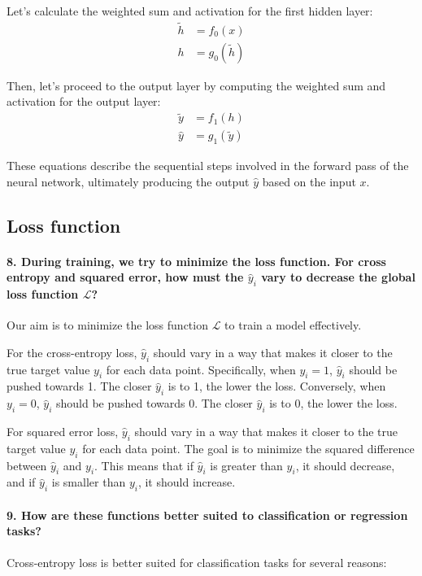 Let's calculate the weighted sum and activation for the first hidden layer:
\begin{align*}
    \tilde{h} & = f_0(x)         \\
    h         & = g_0(\tilde{h})
\end{align*}

Then, let's proceed to the output layer by computing the weighted sum and activation for the output layer:
\begin{align*}
    \tilde{y} & = f_1(h)         \\
    \hat{y}   & = g_1(\tilde{y})
\end{align*}

These equations describe the sequential steps involved in the forward pass of the neural network, ultimately producing the output $\hat{y}$ based on the input $x$.

\subsection{Loss function}
\paragraph{8. During training, we try to minimize the loss function. For cross entropy and squared error, how must the $ \hat{y}_i $  vary to decrease the global loss function $ \mathcal{L} $?}
Our aim is to minimize the loss function $\mathcal{L}$ to train a model effectively.

For the cross-entropy loss, $\hat{y}_i$ should vary in a way that makes it closer to the true target value $y_i$ for each data point. Specifically, when $y_i = 1$, $\hat{y}_i$ should be pushed towards 1. The closer $\hat{y}_i$ is to 1, the lower the loss. Conversely, when $y_i = 0$, $\hat{y}_i$ should be pushed towards 0. The closer $\hat{y}_i$ is to 0, the lower the loss.

For squared error loss, $\hat{y}_i$ should vary in a way that makes it closer to the true target value $y_i$ for each data point. The goal is to minimize the squared difference between $\hat{y}_i$ and $y_i$. This means that if $\hat{y}_i$ is greater than $y_i$, it should decrease, and if $\hat{y}_i$ is smaller than $y_i$, it should increase.

\paragraph{9. How are these functions better suited to classification or regression tasks?}
Cross-entropy loss is better suited for classification tasks for several reasons:

